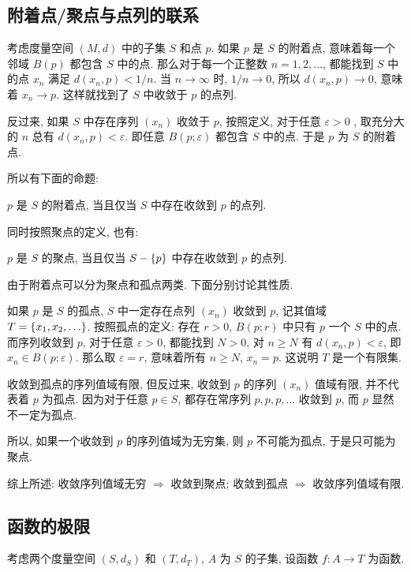 \documentclass[UTF8]{ctexart}
\theoremstyle{mystyle}
\DeclarePairedDelimiter\set{\lbrace}{\rbrace}
\renewcommand{\epsilon}{\varepsilon}
\begin{document}
\subsection{附着点/聚点与点列的联系}
考虑度量空间 $ (M, d) $ 中的子集 $ S $ 和点 $ p $. 如果 $ p $ 是 $ S $ 的附着点, 意味着每一个邻域 $ B(p) $ 都包含 $ S $ 中的点. 那么对于每一个正整数 $ n = 1, 2, \dots $, 都能找到 $ S $ 中的点 $ x_n $ 满足 $ d(x_n, p) < 1 / n $. 当 $ n \to \infty $ 时, $ 1/n \to 0 $, 所以 $ d(x_n, p) \to 0 $, 意味着 $ x_n \to p $. 这样就找到了 $ S $ 中收敛于 $ p $ 的点列.

反过来, 如果 $ S $ 中存在序列 $ (x_n) $ 收敛于 $ p $, 按照定义, 对于任意 $ \epsilon > 0 $ , 取充分大的 $ n $ 总有 $ d(x_n, p) < \epsilon $. 即任意 $ B(p; \epsilon) $ 都包含 $ S $ 中的点. 于是 $ p $ 为 $ S $ 的附着点.

所以有下面的命题:
\begin{proposition}
    $ p $ 是 $ S $ 的附着点, 当且仅当 $ S $ 中存在收敛到 $ p $ 的点列. 
\end{proposition}

同时按照聚点的定义, 也有:
\begin{proposition}
    $ p $ 是 $ S $ 的聚点, 当且仅当 $ S - \set{p} $ 中存在收敛到 $ p $ 的点列.
\end{proposition}

由于附着点可以分为聚点和孤点两类. 下面分别讨论其性质.

如果 $ p $ 是 $ S $ 的孤点, $ S $ 中一定存在点列 $ (x_n) $ 收敛到 $ p $, 记其值域 $ T = \set{x_1, x_2, \dots} $. 按照孤点的定义: 存在 $ r > 0 $, $ B(p; r) $ 中只有 $ p $ 一个 $ S $ 中的点. 而序列收敛到 $ p $, 对于任意 $ \epsilon > 0 $, 都能找到 $ N > 0 $, 对 $ n \geqslant N $ 有 $ d(x_n, p) < \epsilon $, 即 $ x_n \in B(p; \epsilon) $. 那么取 $ \epsilon = r $, 意味着所有 $ n \geqslant N $, $ x_n = p $. 这说明 $ T $ 是一个有限集. 

收敛到孤点的序列值域有限, 但反过来, 收敛到 $ p $ 的序列 $ (x_n) $ 值域有限, 并不代表着 $ p $ 为孤点. 因为对于任意 $ p \in S $, 都存在常序列 $ p, p, p, \dots $ 收敛到 $ p $, 而 $ p $ 显然不一定为孤点.

所以, 如果一个收敛到 $ p $ 的序列值域为无穷集, 则 $ p $ 不可能为孤点, 于是只可能为聚点.

综上所述: 收敛序列值域无穷 $ \Longrightarrow $ 收敛到聚点; 收敛到孤点 $ \Longrightarrow $ 收敛序列值域有限.

\subsection{函数的极限}
考虑两个度量空间 $ (S, d_S) $ 和 $ (T, d_T) $, $ A $ 为 $ S $ 的子集, 设函数 $ f \colon A \to T $ 为函数.
\end{document}
